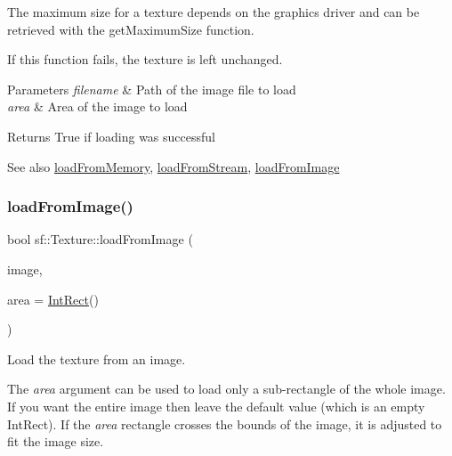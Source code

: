The maximum size for a texture depends on the graphics driver and can be retrieved with the get\+Maximum\+Size function.

If this function fails, the texture is left unchanged.


\begin{DoxyParams}{Parameters}
{\em filename} & Path of the image file to load \\
\hline
{\em area} & Area of the image to load\\
\hline
\end{DoxyParams}
\begin{DoxyReturn}{Returns}
True if loading was successful
\end{DoxyReturn}
\begin{DoxySeeAlso}{See also}
\mbox{\hyperlink{classsf_1_1_texture_a2c4adb19dd4cbee0a588eeb85e52a249}{load\+From\+Memory}}, \mbox{\hyperlink{classsf_1_1_texture_a786b486a46b1c6d1c16ff4af61ecc601}{load\+From\+Stream}}, \mbox{\hyperlink{classsf_1_1_texture_abec4567ad9856a3596dc74803f26fba2}{load\+From\+Image}} \begin{DoxyVerb}\end{DoxyVerb}
 
\end{DoxySeeAlso}
\mbox{\label{classsf_1_1_texture_abec4567ad9856a3596dc74803f26fba2}} 
\subsubsection{\texorpdfstring{loadFromImage()}{loadFromImage()}}
{\footnotesize\ttfamily bool sf\+::\+Texture\+::load\+From\+Image (\begin{DoxyParamCaption}\item[{const \mbox{\hyperlink{classsf_1_1_image}{Image}} \&}]{image,  }\item[{const \mbox{\hyperlink{classsf_1_1_rect}{Int\+Rect}} \&}]{area = {\ttfamily \mbox{\hyperlink{classsf_1_1_rect}{Int\+Rect}}()} }\end{DoxyParamCaption})}



Load the texture from an image. 

The {\itshape area} argument can be used to load only a sub-\/rectangle of the whole image. If you want the entire image then leave the default value (which is an empty Int\+Rect). If the {\itshape area} rectangle crosses the bounds of the image, it is adjusted to fit the image size.

